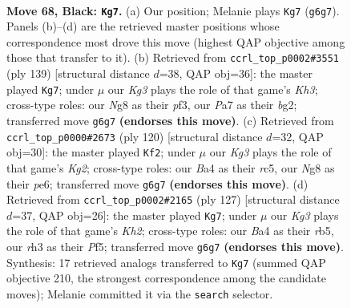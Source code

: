 \documentclass[11pt]{article}
\begin{document}
\clearpage

\begin{figure}[p]\centering
\begin{subfigure}{0.46\textwidth}\centering
\resizebox{\linewidth}{!}{%
\newchessgame
\chessboard[
  setfen={1R4n1/p7/P5kp/1P3p2/b4P2/7R/3r4/4b1K1 b - - 6 68},
  showmover=false,
  pgfstyle=straightmove, color=movearrow, markmove={g6-g7}
]}
\caption{}
\end{subfigure}\hfill
\begin{subfigure}{0.46\textwidth}\centering
\resizebox{\linewidth}{!}{%
\newchessgame
\chessboard[
  setfen={8/8/6pk/3R3p/7P/4rPP1/5bBK/8 b - - 13 70},
  showmover=false,
  pgfstyle=straightmove, color=movearrow, markmove={h6-g7}
]}
\caption{}
\end{subfigure}
\\[4pt]
\begin{subfigure}{0.46\textwidth}\centering
\resizebox{\linewidth}{!}{%
\newchessgame
\chessboard[
  setfen={8/8/3ppkp1/2r5/p1P1R3/P5P1/6K1/1B6 w - - 2 61},
  showmover=false,
  pgfstyle=straightmove, color=movearrow, markmove={g2-f2}
]}
\caption{}
\end{subfigure}\hfill
\begin{subfigure}{0.46\textwidth}\centering
\resizebox{\linewidth}{!}{%
\newchessgame
\chessboard[
  setfen={8/7k/4P1p1/pR3p2/P4P1p/4P2r/1P3K2/8 b - - 0 64},
  showmover=false,
  pgfstyle=straightmove, color=movearrow, markmove={h7-g7}
]}
\caption{}
\end{subfigure}
\caption{\textbf{Move 68, Black: \texttt{Kg7}.} (a) Our position; Melanie plays \texttt{Kg7} (\texttt{g6g7}). Panels (b)--(d) are the retrieved master positions whose correspondence most drove this move (highest QAP objective among those that transfer to it). (b) Retrieved from \texttt{ccrl\_top\_p0002\#3551} (ply 139) [structural distance $d$=38, QAP obj=36]: the master played \texttt{Kg7}; under $\mu$ our \emph{Kg3} plays the role of that game's \emph{Kh3}; cross-type roles: our \emph{N}g8 as their \emph{p}f3, our \emph{P}a7 as their \emph{b}g2; transferred move \texttt{g6g7} \textbf{(endorses this move)}. (c) Retrieved from \texttt{ccrl\_top\_p0000\#2673} (ply 120) [structural distance $d$=32, QAP obj=30]: the master played \texttt{Kf2}; under $\mu$ our \emph{Kg3} plays the role of that game's \emph{Kg2}; cross-type roles: our \emph{B}a4 as their \emph{r}c5, our \emph{N}g8 as their \emph{p}e6; transferred move \texttt{g6g7} \textbf{(endorses this move)}. (d) Retrieved from \texttt{ccrl\_top\_p0002\#2165} (ply 127) [structural distance $d$=37, QAP obj=26]: the master played \texttt{Kg7}; under $\mu$ our \emph{Kg3} plays the role of that game's \emph{Kh2}; cross-type roles: our \emph{B}a4 as their \emph{r}b5, our \emph{r}h3 as their \emph{P}f5; transferred move \texttt{g6g7} \textbf{(endorses this move)}. Synthesis: 17 retrieved analogs transferred to \texttt{Kg7} (summed QAP objective 210, the strongest correspondence among the candidate moves); Melanie committed it via the \texttt{search} selector.}
\label{fig:thought-m135}
\end{figure}
\end{document}
